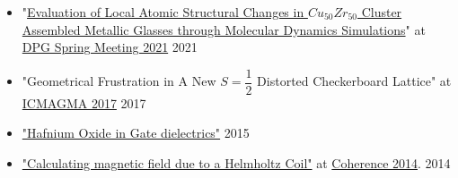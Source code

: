 \vspace{-0.25cm}
\begin{itemize}[noitemsep]

\item "\href{https://www.dpg-verhandlungen.de/year/2021/conference/bpcppdysoe/part/dy/session/42/contribution/2}{Evaluation of Local Atomic Structural Changes in $Cu_{50}Zr_{50}$ Cluster Assembled Metallic Glasses through Molecular Dynamics Simulations}" at \href{https://bpcppdysoe21.dpg-tagungen.de/}{DPG Spring Meeting 2021}  \hfill 2021

\item "Geometrical  Frustration  in  A  New  $S = \dfrac{1}{2}$
Distorted Checkerboard Lattice" at \href{http://icmagma2017.msi.org.in/site/index}{ICMAGMA 2017} \hfill 2017

\item \href{https://prezi.com/z44yzu1cfiqo/hafnium-oxide-in-gate-dielectrics/}{"Hafnium Oxide in Gate dielectrics"} \hfill 2015

\item \href{https://prezi.com/6xdqt-6bppnp/helmholtz-coil-calculations/}{"Calculating magnetic field due to a Helmholtz Coil"} at \href{http://www.tinyurl.com/coherence2014}{Coherence 2014}. \hfill 2014
\end{itemize}


